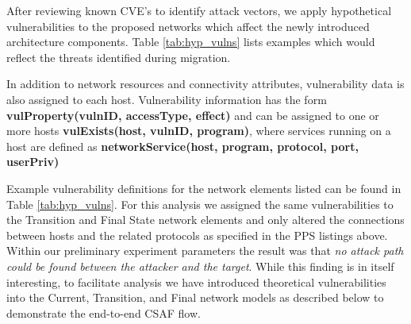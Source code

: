 After reviewing known CVE’s to identify attack vectors, we apply hypothetical vulnerabilities to the proposed networks which affect the newly introduced architecture components. Table \ref{tab:hyp_vulns} lists examples which would reflect the threats identified during migration. 



In addition to network resources and connectivity attributes, vulnerability data is also assigned to each host. Vulnerability information has the form \textbf{vulProperty(vulnID, accessType, effect)} and can be assigned to one or more hosts \textbf{vulExists(host, vulnID, program)}, where services running on a host are defined as \textbf{networkService(host, program, protocol, port, userPriv)}

Example vulnerability definitions for the network elements listed can be found in Table \ref{tab:hyp_vulns}. For this analysis we assigned the same vulnerabilities to the Transition and Final State network elements and only altered the connections between hosts and the related protocols as specified in the PPS listings above. Within our preliminary experiment parameters the result was that \textit{no attack path could be found between the attacker and the target}. While this finding is in itself interesting, to facilitate analysis we have introduced theoretical vulnerabilities into the Current, Transition, and Final network models as described below to demonstrate the end-to-end CSAF flow.   

